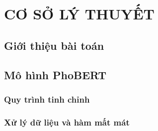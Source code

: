\newpage
%
%
\section{CƠ SỞ LÝ THUYẾT}\label{sec:theory_support}
\subsection{Giới thiệu bài toán}
\subsection{Mô hình PhoBERT}
\subsubsection{Quy trình tinh chỉnh}
\subsubsection{Xử lý dữ liệu và hàm mất mát}

